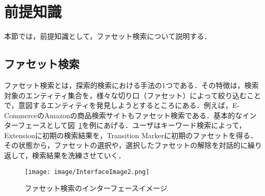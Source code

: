 \section{前提知識}
本節では，前提知識として，ファセット検索について説明する．
%
%
\subsection{ファセット検索}
ファセット検索とは，探索的検索における手法の1つである．その特徴は，検索対象のエンティティ集合を，様々な切り口（ファセット）によって絞り込むことで，意図するエンティティを発見しようとするところにある．例えば，E-CommerceのAmazonの商品検索サイトもファセット検索である．基本的なインターフェースとして図~\ref{fig:InterfaceImage2}を例にあげる．ユーザはキーワード検索によって，Extensionに初期の検索結果を，Transition Markerに初期のファセットを得る．その状態から，ファセットの選択や，選択したファセットの解除を対話的に繰り返して，検索結果を洗練させていく．
%
\begin{figure}[h]
\centering
\texttt{[image: image/InterfaceImage2.png]}
\caption{\small
ファセット検索のインターフェースイメージ
}
\label{fig:InterfaceImage2}
\end{figure}
%

